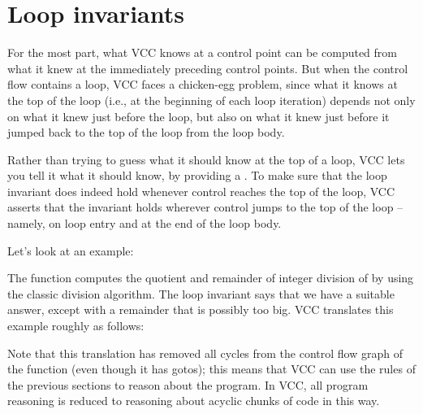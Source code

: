 \section{Loop invariants}

For the most part, what VCC knows at a control point can be
computed from what it knew at the immediately preceding control
points. But when the control flow contains a loop, VCC faces a
chicken-egg problem, since what it knows at the top of the loop (i.e.,
at the beginning of each loop iteration) depends not only on what it
knew just before the loop, but also on what it knew just before it
jumped back to the top of the loop from the loop body.

Rather than trying to guess what it should know at the top of a loop,
VCC lets you tell it what it should know, by providing a . To make sure that the loop invariant does indeed hold 
whenever control reaches the top
of the loop, VCC asserts that the invariant holds wherever control
jumps to the top of the loop -- namely, on loop entry and at the end of
the loop body.


Let's look at an example:
\noindent

The  function computes the quotient and remainder of integer division
of  by  using the classic division algorithm.
The loop invariant says that we have a suitable answer, except with a
remainder that is possibly too big. VCC translates this example roughly as follows:

\noindent
Note that this translation has removed all cycles from the control
flow graph of the function (even though it has gotos); this means that
VCC can use the rules of the previous sections to reason about the
program. In VCC, all program reasoning is reduced to reasoning about
acyclic chunks of code in this way.

